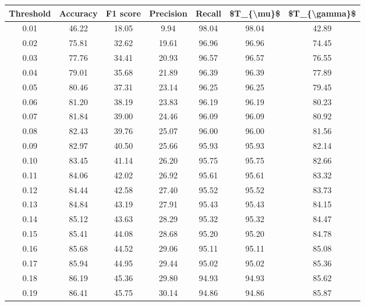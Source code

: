 \begin{tabular}{|c|c|c|c|c|c|c|}
\hline
 Threshold &  Accuracy &  F1 score &  Precision &  Recall &  \$T\_\{\textbackslash mu\}\$ &  \$T\_\{\textbackslash gamma\}\$ \\
\hline
      0.01 &     46.22 &     18.05 &       9.94 &   98.04 &      98.04 &         42.89 \\
      0.02 &     75.81 &     32.62 &      19.61 &   96.96 &      96.96 &         74.45 \\
      0.03 &     77.76 &     34.41 &      20.93 &   96.57 &      96.57 &         76.55 \\
      0.04 &     79.01 &     35.68 &      21.89 &   96.39 &      96.39 &         77.89 \\
      0.05 &     80.46 &     37.31 &      23.14 &   96.25 &      96.25 &         79.45 \\
      0.06 &     81.20 &     38.19 &      23.83 &   96.19 &      96.19 &         80.23 \\
      0.07 &     81.84 &     39.00 &      24.46 &   96.09 &      96.09 &         80.92 \\
      0.08 &     82.43 &     39.76 &      25.07 &   96.00 &      96.00 &         81.56 \\
      0.09 &     82.97 &     40.50 &      25.66 &   95.93 &      95.93 &         82.14 \\
      0.10 &     83.45 &     41.14 &      26.20 &   95.75 &      95.75 &         82.66 \\
      0.11 &     84.06 &     42.02 &      26.92 &   95.61 &      95.61 &         83.32 \\
      0.12 &     84.44 &     42.58 &      27.40 &   95.52 &      95.52 &         83.73 \\
      0.13 &     84.84 &     43.19 &      27.91 &   95.43 &      95.43 &         84.15 \\
      0.14 &     85.12 &     43.63 &      28.29 &   95.32 &      95.32 &         84.47 \\
      0.15 &     85.41 &     44.08 &      28.68 &   95.20 &      95.20 &         84.78 \\
      0.16 &     85.68 &     44.52 &      29.06 &   95.11 &      95.11 &         85.08 \\
      0.17 &     85.94 &     44.95 &      29.44 &   95.02 &      95.02 &         85.36 \\
      0.18 &     86.19 &     45.36 &      29.80 &   94.93 &      94.93 &         85.62 \\
      0.19 &     86.41 &     45.75 &      30.14 &   94.86 &      94.86 &         85.87 \\

\end{tabular}
